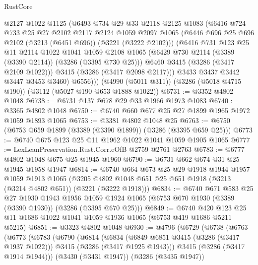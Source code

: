 \begin{lexlean}{RustCore}
\begin{coremodule}
          @2127
          @1022
          @1125
          (@6493
            @734
            @29
            @33
            @2118
            @2125
            @1083
            (@6416
              @724
              @733
              @25
              @27
              @2102
              @2117
              @2124
              @1059
              @2097
              @1065
              (@6446 @696 @25 @696 @2102 (@3213 (@6451 @696)) (@3221 (@3222 @2102)))
              (@6416
                @731
                @123
                @25
                @11
                @2114
                @1022
                @1041
                @1059
                @2108
                @1065
                (@6429 @730 @2114 (@3389 (@3390 @2114)) (@3286 (@3395 @730 @25)))
                @6460
                @3415
                (@3286 (@3417 @2109 @1022)))
              @3415
              (@3286 (@3417 @2098 @2117)))
            @3433
            @3437
            @3442
            @3447
            @3453
            @3460)
          @6556)))
    (@4990 (@5011 @311))
    (@3286 (@5018 @4715 @190))
    (@3112 (@5027 @190 @653 @1888 @1022))
@6731 := @3352 @4802 @1048
@6738 := @6731 @137 @678 @29 @33 @1966 @1973 @1083
@6740 := @3365 @4802 @1048
@6750 := @6740 @660 @677 @25 @27 @1899 @1965 @1972 @1059 @1893 @1065
@6753 := @3381 @4802 @1048 @25
@6763 := @6750 (@6753 @659 @1899 (@3389 (@3390 @1899)) (@3286 (@3395 @659 @25)))
@6773 := @6740 @675 @123 @25 @11 @1962 @1022 @1041 @1059 @1905 @1065
@6777 := LexLeanPreservation.Rust.Corr.eOfB @2759 @2761 @2763
@6783 := @6777 @4802 @1048 @675 @25 @1945 @1960
@6790 := @6731 @662 @674 @31 @25 @1945 @1958 @1947
@6814 := @6740
    @664
    @673
    @25
    @29
    @1918
    @1944
    @1957
    @1059
    @1913
    @1065
    (@3205 @4802 @1048 @651 @25 @651 @1918 (@3213 (@3214 @4802 @651)) (@3221 (@3222 @1918)))
@6834 := @6740
    @671
    @583
    @25
    @27
    @1930
    @1943
    @1956
    @1059
    @1924
    @1065
    (@6753 @670 @1930 (@3389 (@3390 @1930)) (@3286 (@3395 @670 @25)))
@6849 := @6740 @420 @123 @25 @11 @1686 @1022 @1041 @1059 @1936 @1065 (@6753 @419 @1686 @5211 @5215)
@6851 := @3323 @4802 @1048
@6930 := @4796
    (@6729
      (@6738
        (@6763
          (@6773
            (@6783
              (@6790
                (@6814
                  (@6834
                    (@6849 @6851 @3415 (@3286 (@3417 @1937 @1022)))
                    @3415
                    (@3286 (@3417 @1925 @1943)))
                  @3415
                  (@3286 (@3417 @1914 @1944)))
                (@3430 (@3431 @1947))
                (@3286 (@3435 @1947))

\end{coremodule}
\end{lexlean}
